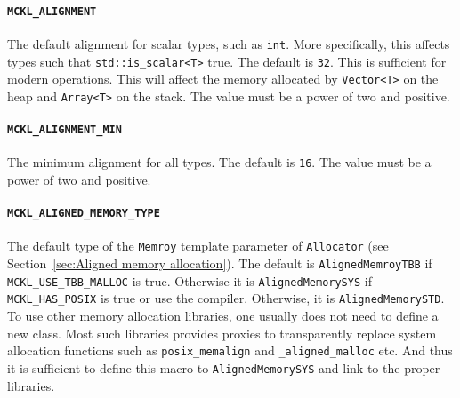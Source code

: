 \paragraph{\texttt{MCKL\_ALIGNMENT}} The default alignment for scalar types,
such as \verb|int|. More specifically, this affects types such that
\verb|std::is_scalar<T>| true. The default is \verb|32|. This is sufficient for
modern \simd operations. This will affect the memory allocated by
\verb|Vector<T>| on the heap and \verb|Array<T>| on the stack. The value must
be a power of two and positive.

\paragraph{\texttt{MCKL\_ALIGNMENT\_MIN}} The minimum alignment for all types.
The default is \verb|16|. The value must be a power of two and positive.

\paragraph{\texttt{MCKL\_ALIGNED\_MEMORY\_TYPE}} The default type of the
\verb|Memroy| template parameter of \verb|Allocator| (see
Section~\ref{sec:Aligned memory allocation}). The default is
\verb|AlignedMemroyTBB| if \verb|MCKL_USE_TBB_MALLOC| is true. Otherwise it is
\verb|AlignedMemorySYS| if \verb|MCKL_HAS_POSIX| is true or use the \msvc
compiler. Otherwise, it is \verb|AlignedMemorySTD|. To use other memory
allocation libraries, one usually does not need to define a new class. Most
such libraries provides proxies to transparently replace system allocation
functions such as \verb|posix_memalign| and \verb|_aligned_malloc| etc. And
thus it is sufficient to define this macro to \verb|AlignedMemorySYS| and link
to the proper libraries.

